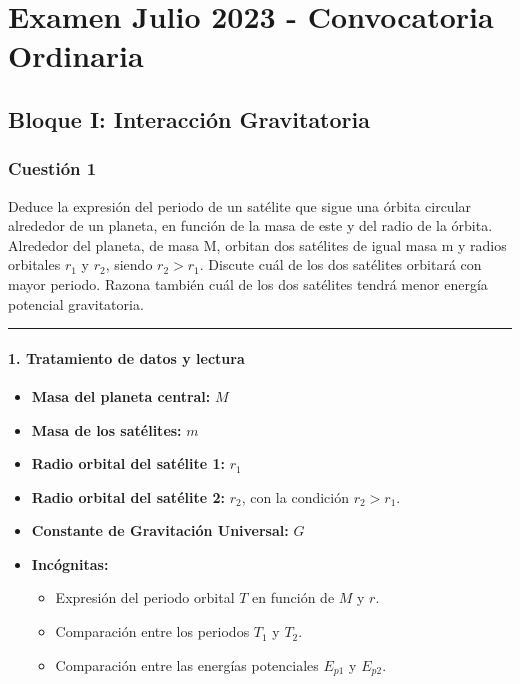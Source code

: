 \chapter{Examen Julio 2023 - Convocatoria Ordinaria}
\label{chap:2023_jul_ord}

\section{Bloque I: Interacción Gravitatoria}
\label{sec:grav_2023_jul_ord}

\subsection{Cuestión 1}
\label{subsec:C1_2023_jul_ord}

\begin{cajaenunciado}
Deduce la expresión del periodo de un satélite que sigue una órbita circular alrededor de un planeta, en función de la masa de este y del radio de la órbita.
Alrededor del planeta, de masa M, orbitan dos satélites de igual masa m y radios orbitales $r_1$ y $r_2$, siendo $r_{2}>r_{1}$. Discute cuál de los dos satélites orbitará con mayor periodo. Razona también cuál de los dos satélites tendrá menor energía potencial gravitatoria.
\end{cajaenunciado}
\hrule

\subsubsection*{1. Tratamiento de datos y lectura}
\begin{itemize}
    \item \textbf{Masa del planeta central:} $M$
    \item \textbf{Masa de los satélites:} $m$
    \item \textbf{Radio orbital del satélite 1:} $r_1$
    \item \textbf{Radio orbital del satélite 2:} $r_2$, con la condición $r_2 > r_1$.
    \item \textbf{Constante de Gravitación Universal:} $G$
    \item \textbf{Incógnitas:}
    \begin{itemize}
        \item Expresión del periodo orbital $T$ en función de $M$ y $r$.
        \item Comparación entre los periodos $T_1$ y $T_2$.
        \item Comparación entre las energías potenciales $E_{p1}$ y $E_{p2}$.
    \end{itemize}
\end{itemize}

